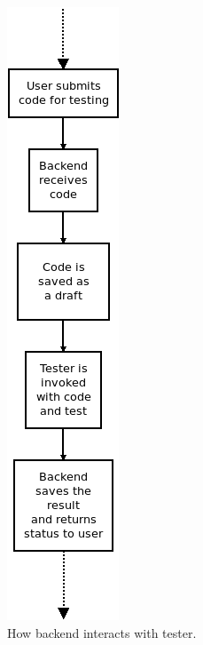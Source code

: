 \begin{figure}
    \begin{subfigure}{.38\linewidth}
    \centering
    \includegraphics[width=.3\linewidth]{img/tester_usage.png}
    \caption{How backend interacts with tester.}
    \end{subfigure}
    \begin{subfigure}{.6\linewidth}
    \centering

\end{subfigure}
\end{figure}
